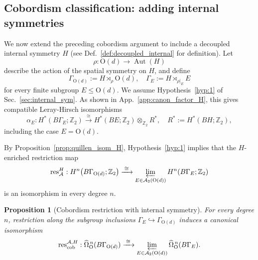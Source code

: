 \documentclass[aps,prx,reprint,superscriptaddress,twocolumn,amsmath,amssymb,amsfonts, nofootinbib]{revtex4-2}
\newcommand{\res}{\text{res}}
\theoremstyle{apsstyle}
\newtheorem{proposition}[theorem]{Proposition}
\begin{document}
\subsection{Cobordism classification: adding internal symmetries}
\label{app:cob_int}


We now extend the preceding cobordism argument to include a decoupled internal symmetry $H$ (see Def.~\ref{def:decoupled_internal} for definition). Let
\begin{equation*}
    \rho:
    \mathrm O(d)\longrightarrow\operatorname{Aut}(H)
\end{equation*}
describe the action of the spatial symmetry on $H$, and define
\begin{equation*}
    \Gamma_{\mathrm O(d)}
    := H\rtimes_{\rho}\mathrm O(d),
    \quad
    \Gamma_E
    := H\rtimes_{\rho|_E}E
\end{equation*}
for every finite subgroup $E\leq\mathrm O(d)$. We assume
Hypothesis~\ref{hyp:1} of Sec.~\ref{sec:internal_sym}. As shown in
App.~\ref{app:canon_factor_H}, this gives compatible Leray-Hirsch
isomorphisms
\begin{equation*}
    \alpha_E:
    H^*(B\Gamma_E;\mathbb Z_2)
    \xrightarrow{\;\cong\;}
    H^*(BE;\mathbb Z_2)\otimes_{\mathbb Z_2}R^*,
    \quad
    R^*:=H^*(BH;\mathbb Z_2),
\end{equation*}
including the case $E=\mathrm O(d)$.

\bigskip 

\noindent By Proposition~\ref{prop:quillen_isom_H}, Hypothesis~\ref{hyp:1}
implies that the $H$-enriched restriction map
\begin{equation}
    \res_{\mathcal A}^{H}:
    H^n\bigl(B\Gamma_{\mathrm O(d)};\mathbb Z_2\bigr)
    \xrightarrow{\;\cong\;}
    \varprojlim_{E\in\mathcal A_2(\mathrm O(d))}
    H^n(B\Gamma_E;\mathbb Z_2)
    \label{eq:internal_cohomology_restriction}
\end{equation}
is an isomorphism in every degree $n$.

\bigskip 

\begin{proposition}[Cobordism restriction with internal symmetry]
\label{prop:cobordism_restriction_internal}
For every degree $n$, restriction along the subgroup inclusions
$\Gamma_E\hookrightarrow\Gamma_{\mathrm{O}(d)}$ induces a canonical isomorphism
\begin{equation}
    \res_{\mathrm{cob}}^{\mathcal A,H}:
    \widehat{\Omega}_{\mathrm O}^{\,n}(B\Gamma_{\mathrm{O}(d)})
    \xrightarrow{\;\cong\;}
    \varprojlim_{E\in\mathcal A_2(\mathrm O(d))}
    \widehat{\Omega}_{\mathrm O}^{\,n}(B\Gamma_E).
    \label{eq:cobordism_restriction_internal}
\end{equation}
\end{proposition}
\end{document}

